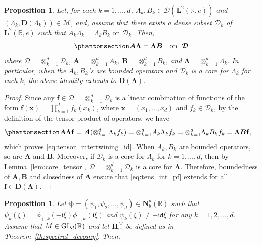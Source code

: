 \documentclass[12pt]{amsart}
\newcommand{\hlabel}{\phantomsection\label}
\newcommand{\hptg}[2]{\hypertarget{#1}{#2}}
\numberwithin{equation}{section}
\newcommand{\bb}{\mathbb}
\newcommand{\cc}{\mathcal}
\newcommand{\tred}{}
\newcommand{\ttt}{\mathtt}
\newcommand{\bmrm}[2][2]{\mathbf{#2}^{#1}}
\newcommand{\D}{\mathbf{D}}
\renewcommand{\i}{\mathrm{i}}
\newcommand{\LRe}{\bmrm{L}(\bb{R},e)}
\newcommand{\f}{\mathbf{f}}
\newtheorem{prop}[thm]{Proposition}
\theoremstyle{definition}
\theoremstyle{assump}
\newtheorem{corr}[thm]{Corollary}
\theoremstyle{remark}
\begin{document}
{\begin{prop}\hlabel{prop:tensor_intertwining}
Let, for each $k=1, \ldots,d$, $A_k, B_k \in \mathscr{D}(\bmrm{L}(\bb{R},e))$ and $(\Lambda_k,\D(\Lambda_k)) \in \mathscr{M}$, and, assume that there exists a dense subset $\cc{D}_k$ of $\LRe$ such that
$ A_k\Lambda_k=\Lambda_k B_k  \mbox{ on } \cc{D}_k$. Then,
\begin{align}\hlabel{eq:tensor_intertwining_id}
\bm{A}\bm{\Lambda}=\bm{\Lambda}\bm{B} \ \ \ \mbox{on \ $\bm{\cc D}$}
\end{align}
where $\bm{\cc D}=\otimes_{k=1}^d \cc{D}_k$, $\bm{A}=\otimes_{k=1}^d A_k, \ \bm{B}=\otimes_{k=1}^d B_k$, and $\bm{\Lambda}=\otimes_{k=1}^d \Lambda_k$. In particular, when the $A_k,B_k$'s are bounded operators and $\cc{D}_k$ is a core for $\Lambda_k$ for each $k$, the above identity extends to $\D(\bm{\Lambda})$.
\end{prop}
\begin{proof} Since any $\f\in\bm{\cc D}=\otimes_{k=1}^d\cc{D}_k$ \hptg{C78}{is a linear combination of functions of the form} $\f(\bm{x})=\prod_{k=1}^d f_k(x_k)$,
	where $\bm{x}=(x_1,\ldots, x_d)$ and $f_k\in\cc{D}_k$, by the definition of the tensor product of operators, we have
	\begin{equation}\hlabel{eq:tens_int_pf}
		\begin{aligned}
			\bm{A}\bm{\Lambda}\f&=\bm{A}(\otimes_{k=1}^d\Lambda_k f_k)
			=\otimes_{k=1}^d A_k\Lambda_k f_k=\otimes_{k=1}^d \Lambda_k B_k f_k =\bm{\Lambda}\bm{B}\f,
		\end{aligned}
	\end{equation}
which proves \eqref{eq:tensor_intertwining_id}. When $A_k,B_k$ are bounded operators, so are $\bm{A}$ and $\bm{B}$. Moreover, if $\cc{D}_k$ is a core for $\Lambda_k$ for $k=1,\ldots ,d$, then by Lemma~\ref{lem:core_tensor}, $\bm{\cc D}=\otimes_{k=1}^d\cc{D}_k$ is a core for $\bm{\Lambda}$. Therefore, boundedness of $\bm{A}, \bm{B}$ and \tred{closedness} of $\bm{\Lambda}$ ensure that \eqref{eq:tens_int_pf} extends for all $\f\in\D(\bm{\Lambda})$.
\end{proof}
\begin{prop}\hlabel{prop:core}
	Let $\bm{\psi}=(\psi_1,\psi_2,\ldots, \psi_d)\in\mathbf{N}^d_b(\bb{R})$ such that $\psi_k(\xi)=\phi_{+,k}(-\mathrm{i}\xi)\phi_{-,k}(\mathrm{i}\xi)$ and  $\psi_k(\xi)\neq -\i\ttt{d}\xi$ for any $k=1,2,\ldots, d$. Assume that $M \in {\rm{GL}}_d(\bb{R})$ and let $\bm{H}^M_{\bm{\psi}}$ be defined as in Theorem~\ref{th:spectral_decomp}. Then,

\end{prop}}
\end{document}
